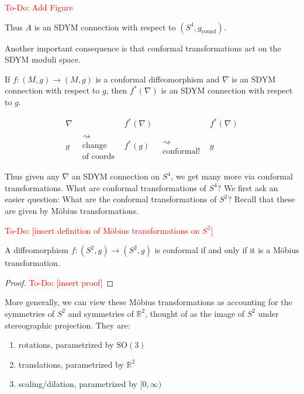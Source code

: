 \documentclass[main]{subfiles}
\begin{document}
\textcolor{red}{To-Do: Add Figure}

Thus $A$ is an SDYM connection with respect to $(S^4,g_{\mathrm{round}})$.

Another important consequence is that conformal transformations act on the SDYM moduli space.

\begin{proposition}
If $f:(M,g)\to(M,g)$ is a conformal diffeomorphism and $\nabla$ is an SDYM connection with respect to $g$, then $f^\ast(\nabla)$ is an SDYM connection with respect to $g$.
\end{proposition}

\[
\begin{array}{ccccc}
\nabla & & f^\ast(\nabla) & & f^\ast(\nabla)\\
g & \substack{\rightsquigarrow\\ \text{change}\\ \text{of coords}} & f^\ast(g) & \substack{\rightsquigarrow\\ \text{conformal!}} & g
\end{array}
\]

Thus given any $\nabla$ an SDYM connection on $S^4$, we get many more via conformal transformations. What are conformal transformations of $S^4$? We first ask an easier question: What are the conformal transformations of $S^2$? Recall that these are given by M\"obius transformations.

\begin{definition}
\textcolor{red}{To-Do: [insert definition of M\"obius transformations on $S^2$]}
\end{definition}

\begin{proposition}
A diffeomorphism $f:(S^2,g)\to(S^2,g)$ is conformal if and only if it is a M\"obius transformation.
\end{proposition}

\begin{proof}
\textcolor{red}{To-Do: [insert proof]}
\end{proof}

More generally, we can view these M\"obius transformations as accounting for the symmetries of $S^2$ and symmetries of $\mathbb{R}^2$, thought of as the image of $S^2$ under stereographic projection. They are:
\begin{enumerate}
\item rotations, parametrized by $\mathrm{SO}(3)$
\item translations, parametrized by $\mathbb{R}^2$
\item scaling/dilation, parametrized by $[0,\infty)$
\end{enumerate}
\end{document}
